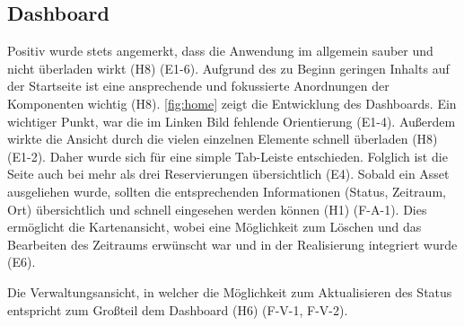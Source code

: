 \subsection{Dashboard}
Positiv wurde stets angemerkt, dass die Anwendung im allgemein sauber und nicht überladen wirkt (H8)
(E1-6). Aufgrund des zu Beginn geringen Inhalts auf der Startseite ist eine ansprechende und
fokussierte Anordnungen der Komponenten wichtig (H8). \ref{fig:home} zeigt die Entwicklung des
Dashboards. Ein wichtiger Punkt, war die im Linken Bild fehlende Orientierung (E1-4). Außerdem
wirkte die Ansicht durch die vielen einzelnen Elemente schnell überladen (H8) (E1-2). Daher wurde
sich für eine simple Tab-Leiste entschieden. Folglich ist die Seite auch bei mehr als drei
Reservierungen übersichtlich (E4). Sobald ein Asset ausgeliehen wurde, sollten die entsprechenden
Informationen (Status, Zeitraum, Ort) übersichtlich und schnell eingesehen werden können (H1)
(F-A-1). Dies ermöglicht die Kartenansicht, wobei eine Möglichkeit zum Löschen und das Bearbeiten
des Zeitraums erwünscht war und in der Realisierung integriert wurde (E6).

Die Verwaltungsansicht, in welcher die Möglichkeit zum Aktualisieren des Status entspricht zum
Großteil dem Dashboard (H6) (F-V-1, F-V-2).


